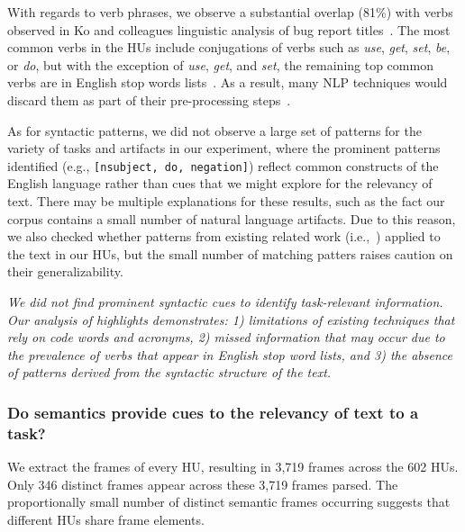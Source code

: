 With regards to verb phrases, we observe a substantial
overlap (81\%) with verbs observed in Ko and colleagues linguistic analysis
of bug report titles~\cite{Ko2006}.
The most common verbs in the HUs include conjugations of verbs such as \textit{use}, \textit{get}, \textit{set}, \textit{be}, or \textit{do},
but with the exception of \textit{use}, \textit{get}, and \textit{set}, the
remaining top common verbs are in English stop words lists~\cite{jurafsky2014speech}. As a result, many
\acs{NLP} techniques would discard them as part of their pre-processing
steps~\cite{Bavota2016}.






As for syntactic patterns, we did not observe a large set of patterns for the variety of tasks and artifacts in our experiment,
where the prominent patterns identified (e.g., \texttt{[nsubject, do, negation]})
reflect common constructs of the English language rather than cues that we might explore for the relevancy of text.
There may be multiple explanations for these results, such as
the fact our corpus contains a small number of natural language artifacts.
Due to this reason, we also checked whether patterns from existing related work (i.e.,~\cite{Chaparro2017, Robillard2015}) applied to the text in our HUs, 
but the small number of matching patters 
raises caution on
their generalizability.



\medskip
\begin{bluequote}
    \textit{We did not find prominent syntactic cues to identify
    task-relevant information. Our analysis of highlights demonstrates:
    1) limitations of existing techniques that rely on code
    words and acronyms, 2) missed
    information that may occur due to the prevalence of verbs that
    appear in English stop word lists,
    and 3) the absence of patterns derived from the syntactic structure of
    the text.}
\end{bluequote}

 



\subsubsection{Do semantics provide cues to the relevancy of text to a task?}
\label{cp3:semantic-analysis}


We extract the frames of every HU, resulting in 3,719 frames across
the 602 HUs. Only 346 distinct frames appear across these 3,719 frames
parsed. The proportionally small number of distinct semantic frames
occurring
suggests that different HUs share frame elements. 



